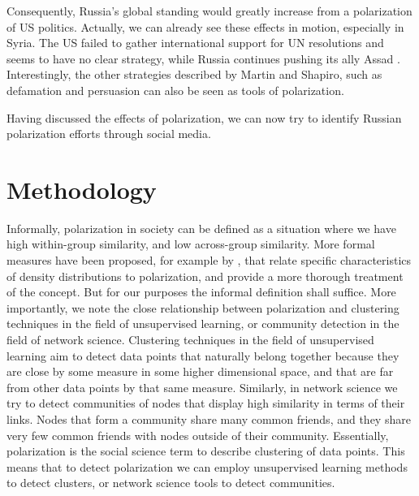 \documentclass[12pt, authoryear]{elsarticle}
\begin{document}
Consequently, Russia's global standing would greatly increase from a polarization of US politics. Actually, we can already see these effects in motion, especially in Syria. The US failed to gather international support for UN resolutions and seems to have no clear strategy, while Russia continues pushing its ally Assad \citep{bolan_2019}. Interestingly, the other strategies described by Martin and Shapiro, such as defamation and persuasion can also be seen as tools of polarization. 

Having discussed the effects of polarization, we can now try to identify Russian polarization efforts through social media. 

\section{Methodology}
Informally, polarization in society can be defined as a situation where we have high within-group similarity, and low across-group similarity. More formal measures have been proposed, for example by \cite{duclos2004polarization}, that relate specific characteristics of density distributions to polarization, and provide a more thorough treatment of the concept. But for our purposes the informal definition shall suffice. More importantly, we note the close relationship between polarization and clustering techniques in the field of unsupervised learning, or community detection in the field of network science. Clustering techniques in the field of unsupervised learning aim to detect data points that naturally belong together because they are close by some measure in some higher dimensional space, and that are far from other data points by that same measure. Similarly, in network science we try to detect communities of nodes that display high similarity in terms of their links. Nodes that form a community share many common friends, and they share very few common friends with nodes outside of their community. Essentially, polarization is the social science term to describe clustering of data points. This means that to detect polarization we can employ unsupervised learning methods to detect clusters, or network science tools to detect communities. 
\end{document}
